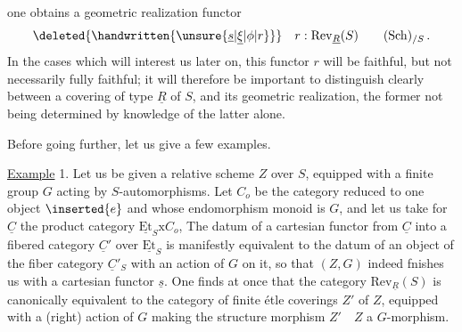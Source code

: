  one obtains a geometric realization functor
\[
\deleted{\handwritten{\unsure{\underline{s}|\underline{\xi}|\phi|r}}}\quad r:\mathrm{Rev}_{\underline{R}}(S)\qquad(\mathrm{Sch})_{/S}\,.
\]
In the cases which will interest us later on, this functor $r$ will be faithful, but not necessarily fully faithful; it will therefore be important to distinguish clearly between a covering of type $\underline{R}$ of $S$, and its geometric realization, the former not being determined by knowledge of the latter alone.

Before going further, let us give a few examples.

\uline{Example} 1. Let us be given a relative scheme $Z$ over $S$, equipped with a finite group $G$ acting  by $S$-automorphisms. Let $C_o$ be the category reduced to one object $\inserted{e}$ and whose endomorphism monoid is $G$, and let us take for $\underline{C}$ the product category $\underline{\mathrm{Et}}_S\mathrm{x}C_o$,  The datum of a cartesian functor from  $\underline{C}$ into a fibered category $\underline{C}'$ over $\underline{\mathrm{Et}}_S$ is manifestly equivalent to the datum of an object of the fiber category $\underline{C}'_S$ with an action of $G$ on it, so that $(Z,G)$ indeed fnishes us with a cartesian functor $\underline{s}$. One finds at once that the category $\mathrm{Rev}_{\underline{R}}(S)$ is canonically equivalent to the  category of finite étle coverings $Z'$ of $Z$, equipped with a (right) action of $G$  making the structure morphism $Z'\quad Z$ a $G$-morphism.

